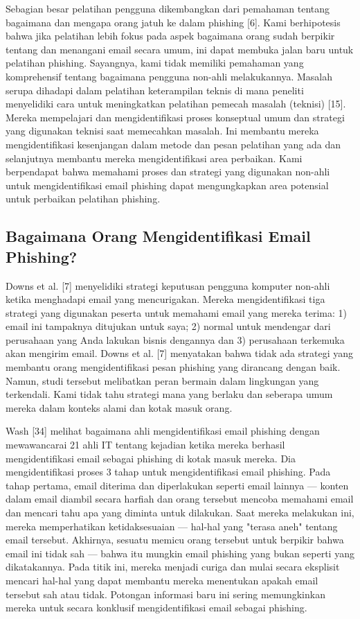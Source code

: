 \documentclass[lettersize,journal]{IEEEtran}
\begin{document}
Sebagian besar pelatihan pengguna dikembangkan dari pemahaman tentang bagaimana
dan mengapa orang jatuh ke dalam phishing [6]. Kami berhipotesis bahwa jika
pelatihan lebih fokus pada aspek bagaimana orang sudah berpikir tentang dan
menangani email secara umum, ini dapat membuka jalan baru untuk pelatihan
phishing. Sayangnya, kami tidak memiliki pemahaman yang komprehensif tentang
bagaimana pengguna non-ahli melakukannya. Masalah serupa dihadapi dalam
pelatihan keterampilan teknis di mana peneliti menyelidiki cara untuk
meningkatkan pelatihan pemecah masalah (teknisi) [15]. Mereka mempelajari dan
mengidentifikasi proses konseptual umum dan strategi yang digunakan teknisi
saat memecahkan masalah. Ini membantu mereka mengidentifikasi kesenjangan dalam
metode dan pesan pelatihan yang ada dan selanjutnya membantu mereka
mengidentifikasi area perbaikan. Kami berpendapat bahwa memahami proses dan
strategi yang digunakan non-ahli untuk mengidentifikasi email phishing dapat
mengungkapkan area potensial untuk perbaikan pelatihan phishing.

\subsection{Bagaimana Orang Mengidentifikasi Email Phishing?}

Downs et al. [7] menyelidiki strategi keputusan pengguna komputer non-ahli
ketika menghadapi email yang mencurigakan. Mereka mengidentifikasi tiga
strategi yang digunakan peserta untuk memahami email yang mereka terima: 1)
email ini tampaknya ditujukan untuk saya; 2) normal untuk mendengar dari
perusahaan yang Anda lakukan bisnis dengannya dan 3) perusahaan terkemuka akan
mengirim email. Downs et al. [7] menyatakan bahwa tidak ada strategi yang
membantu orang mengidentifikasi pesan phishing yang dirancang dengan baik.
Namun, studi tersebut melibatkan peran bermain dalam lingkungan yang
terkendali. Kami tidak tahu strategi mana yang berlaku dan seberapa umum mereka
dalam konteks alami dan kotak masuk orang.

Wash [34] melihat bagaimana ahli mengidentifikasi email phishing dengan
mewawancarai 21 ahli IT tentang kejadian ketika mereka berhasil
mengidentifikasi email sebagai phishing di kotak masuk mereka. Dia
mengidentifikasi proses 3 tahap untuk mengidentifikasi email phishing. Pada
tahap pertama, email diterima dan diperlakukan seperti email lainnya — konten
dalam email diambil secara harfiah dan orang tersebut mencoba memahami email
dan mencari tahu apa yang diminta untuk dilakukan. Saat mereka melakukan ini,
mereka memperhatikan ketidaksesuaian — hal-hal yang "terasa aneh" tentang email
tersebut. Akhirnya, sesuatu memicu orang tersebut untuk berpikir bahwa email
ini tidak sah — bahwa itu mungkin email phishing yang bukan seperti yang
dikatakannya. Pada titik ini, mereka menjadi curiga dan mulai secara eksplisit
mencari hal-hal yang dapat membantu mereka menentukan apakah email tersebut sah
atau tidak. Potongan informasi baru ini sering memungkinkan mereka untuk secara
konklusif mengidentifikasi email sebagai phishing.
\end{document}
